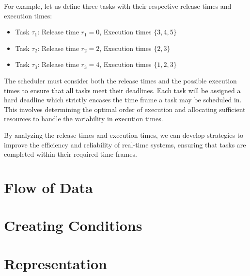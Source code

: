 For example, let us define three tasks with their respective release times and execution times:

\begin{itemize}
	\item Task \( \tau_1 \): Release time \( r_1 = 0 \), Execution times \( \{3, 4, 5\} \)
	\item Task \( \tau_2 \): Release time \( r_2 = 2 \), Execution times \( \{2, 3\} \)
	\item Task \( \tau_3 \): Release time \( r_3 = 4 \), Execution times \( \{1, 2, 3\} \)
\end{itemize}

The scheduler must consider both the release times and the possible execution times to ensure that all tasks meet their deadlines.
Each task will be assigned a hard deadline which strictly encases the time frame a task may be scheduled in. 
This involves determining the optimal order of execution and allocating sufficient resources to handle the variability in execution times.

By analyzing the release times and execution times, we can develop strategies to improve the efficiency and reliability of real-time systems, ensuring that tasks are completed within their required time frames.

\section{Flow of Data}
\label{sec:flow_of_data}

\section{Creating Conditions}
\label{sec:creating_conditions}

\section{Representation}
\label{sec:representation}